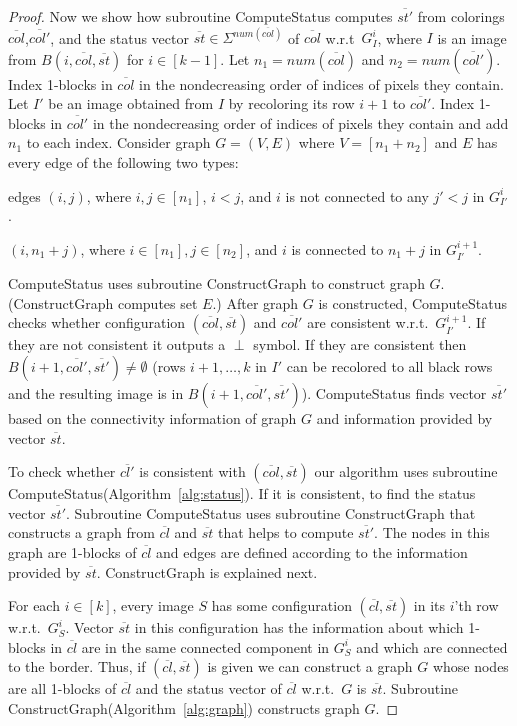 \documentclass[11pt,english]{article}
\renewenvironment{enumerate}[1]{\begin{compactenum}#1}{\end{compactenum}}
\numberwithin{figure}{section}
\newcommand{\Compst}{{\sf ComputeStatus}\xspace}
\newcommand{\Constgr}{{\sf ConstructGraph}\xspace}
\begin{document}
\begin{proof}
Now we show how subroutine \Compst computes $\overline{st'}$ from colorings $\overline{col}$,$\overline{col'}$, and the status vector $\overline{st}\in\Sigma^{num(\overline{col})}$ of $\overline{col}$ w.r.t\ $G^i_{I}$, where $I$ is an image from $B(i,\overline{col},\overline{st})$ for $i\in[k-1]$. Let $n_1=num(\overline{col})$ and $n_2=num(\overline{col'})$. Index 1-blocks in $\overline{col}$ in the nondecreasing order of indices of pixels they contain. Let $I'$ be an image obtained from $I$ by recoloring its row $i+1$ to $\overline{col'}$. Index 1-blocks in $\overline{col'}$ in the nondecreasing order of indices of pixels they contain and add $n_1$ to each index. Consider graph $G=(V,E)$ where $V=[n_1+n_2]$ and $E$ has every edge of the following two types:
\begin{enumerate}
\item edges $(i,j)$, where $i,j\in[n_1]$, $i<j$, and $i$ is not connected to any $j'<j$ in  $G^{i}_{I'}$.
\item $(i,n_1+j)$, where $i\in[n_1], j\in[n_2]$, and $i$ is connected to $n_1+j$ in $G^{i+1}_{I'}$.
\end{enumerate}

\Compst uses subroutine \Constgr to construct graph $G$. (\Constgr computes set $E$.)
After graph $G$ is constructed, \Compst checks whether configuration  $(\overline{col},\overline{st})$ and $\overline{col'}$ are consistent w.r.t.\ $G^{i+1}_{I'}$. If they are not consistent it outputs a $\perp$ symbol. If they are consistent then $B(i+1,\overline{col'},\overline{st'})\neq\emptyset$ (rows $i+1,\ldots, k$ in $I'$ can be recolored to all black rows and the resulting image is in $B(i+1,\overline{col'},\overline{st'})$). \Compst finds vector $\overline{st'}$ based on the connectivity information of graph $G$ and information provided by vector $\overline{st}$.


To check whether $\overline{cl'}$ is consistent with $(\overline{col},\overline{st})$ our algorithm uses subroutine \Compst (Algorithm~\ref{alg:status}). If it is consistent, to
find the status vector $\overline{st'}$. Subroutine \Compst uses subroutine \Constgr that constructs a graph from $\overline{cl}$ and $\overline{st}$ that helps to compute $\overline{st'}$. The nodes in this graph are 1-blocks of $\overline{cl}$ and edges are defined according to the information provided by $\overline{st}$. \Constgr is explained next.

For each $i\in[k]$, every image $S$ has some configuration $(\overline{cl},\overline{st})$ in its $i$'th row w.r.t.\ $G^i_S$. Vector $\overline{st}$ in this  configuration has the information about which 1-blocks in $\overline{cl}$ are in the same connected component in $G^i_S$ and which are connected to the border. Thus, if $(\overline{cl},\overline{st})$ is given we can construct a graph $G$ whose nodes are all 1-blocks of $\overline{cl}$ and the status vector of $\overline{cl}$ w.r.t.\ $G$ is $\overline{st}$. Subroutine \Constgr (Algorithm~\ref{alg:graph}) constructs graph $G$.


\end{proof}
\end{document}

